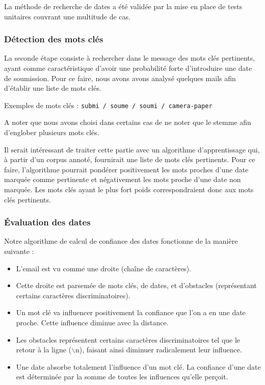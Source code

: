 \documentclass[a4paper,french,10pt]{article}
\begin{document}
La méthode de recherche de dates a été validée par la mise en place de tests unitaires couvrant une multitude de cas.

\subsubsection{Détection des mots clés}
La seconde étape consiste à rechercher dans le message des mots clés pertinents, ayant comme caractéristique d'avoir une probabilité forte d'introduire une date de soumission. Pour ce faire, nous avons avons analysé quelques mails afin d'établir une liste de mots clés.

Exemples de mots clés : \texttt{submi / soume / soumi / camera-paper}

A noter que nous avons choisi dans certains cas de ne noter que le stemme afin d'englober plusieurs mots clés.

Il serait intéressant de traiter cette partie avec un algorithme d'apprentissage qui, à partir d'un corpus annoté, fournirait une liste de mots clés pertinents. Pour ce faire, l'algorithme pourrait pondérer positivement les mots proches d'une date marquée comme pertinente et négativement les mots proche d'une date non marquée. Les mots clés ayant le plus fort poids correspondraient donc aux mots clés pertinents.

\subsubsection{Évaluation des dates}

Notre algorithme de calcul de confiance des dates fonctionne de la manière suivante :

\begin{itemize}
\item L'email est vu comme une droite (chaîne de caractères).
\item Cette droite est parsemée de mots clés, de dates, et d'obstacles (représentant certains caractères discriminatoires).
\item Un mot clé va influencer positivement la confiance que l'on a en une date proche. Cette influence diminue avec la distance.
\item Les obstacles représentent certains caractères discriminatoires tel que le retour à la ligne ($\backslash$n), faisant ainsi diminuer radicalement leur influence.
\item Une date absorbe totalement l'influence d'un mot clé. La confiance d'une date est déterminée par la somme de toutes les influences qu'elle perçoit.
\end{itemize}
\end{document}
